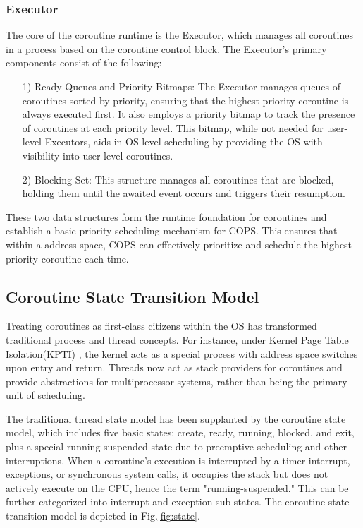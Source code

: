 \documentclass[conference]{IEEEtran}
\begin{document}
\subsubsection{Executor}
\label{subsubsection: executor}

The core of the coroutine runtime is the Executor, which manages all coroutines in a process based on the coroutine control block. The Executor's primary components consist of the following:

\begin{itemize}[leftmargin=*]
    \item[1)] Ready Queues and Priority Bitmaps: The Executor manages queues of coroutines sorted by priority, ensuring that the highest priority coroutine is always executed first. It also employs a priority bitmap to track the presence of coroutines at each priority level. This bitmap, while not needed for user-level Executors, aids in OS-level scheduling by providing the OS with visibility into user-level coroutines.
    \item[2)] Blocking Set: This structure manages all coroutines that are blocked, holding them until the awaited event occurs and triggers their resumption.
\end{itemize}

These two data structures form the runtime foundation for coroutines and establish a basic priority scheduling mechanism for COPS. This ensures that within a address space, COPS can effectively prioritize and schedule the highest-priority coroutine each time.

\subsection{Coroutine State Transition Model}
\label{section: state-transition}

Treating coroutines as first-class citizens within the OS has transformed traditional process and thread concepts. For instance, under Kernel Page Table Isolation(KPTI) \cite{kpti}, the kernel acts as a special process with address space switches upon entry and return. Threads now act as stack providers for coroutines and provide abstractions for multiprocessor systems, rather than being the primary unit of scheduling.

The traditional thread state model has been supplanted by the coroutine state model, which includes five basic states: create, ready, running, blocked, and exit, plus a special running-suspended state due to preemptive scheduling and other interruptions. When a coroutine's execution is interrupted by a timer interrupt, exceptions, or synchronous system calls, it occupies the stack but does not actively execute on the CPU, hence the term "running-suspended." This can be further categorized into interrupt and exception sub-states. The coroutine state transition model is depicted in Fig.\ref{fig:state}.
\end{document}
